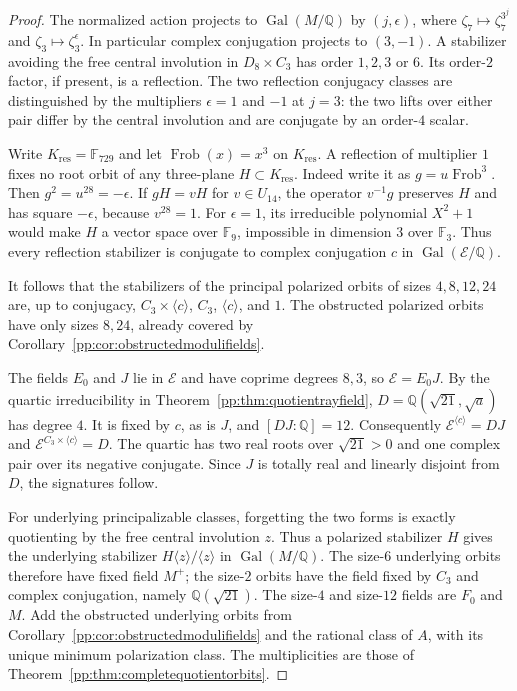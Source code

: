\begin{proof}
The normalized action projects to $\operatorname{Gal}(M/\mathbb Q)$
by $(j,\epsilon)$, where $\zeta_7\mapsto\zeta_7^{3^j}$ and
$\zeta_3\mapsto\zeta_3^\epsilon$. In particular complex conjugation
projects to $(3,-1)$. A stabilizer avoiding the free central involution
in $D_8\times C_3$ has order $1,2,3$ or $6$. Its order-$2$ factor,
if present, is a reflection. The two reflection conjugacy classes are
distinguished by the multipliers $\epsilon=1$ and $-1$ at $j=3$:
the two lifts over either pair differ by the central involution and
are conjugate by an order-$4$ scalar.

Write $K_{\mathrm{res}}=\mathbb F_{729}$ and let
$\operatorname{Frob}(x)=x^3$ on $K_{\mathrm{res}}$.
A reflection of multiplier $1$ fixes no root orbit of any three-plane
$H\subset K_{\mathrm{res}}$. Indeed write it as $g=u\operatorname{Frob}^3$. Then
$g^2=u^{28}=-\epsilon$. If $gH=vH$ for $v\in U_{14}$, the operator
$v^{-1}g$ preserves $H$ and has square $-\epsilon$, because $v^{28}=1$.
For $\epsilon=1$, its irreducible polynomial $X^2+1$ would make $H$
a vector space over $\mathbb F_9$, impossible in dimension $3$ over
$\mathbb F_3$. Thus every reflection stabilizer is conjugate to complex
conjugation $c$ in $\operatorname{Gal}(\mathcal E/\mathbb Q)$.

It follows that the stabilizers of the principal polarized orbits of
sizes $4,8,12,24$ are, up to conjugacy,
$C_3\times\langle c\rangle$, $C_3$, $\langle c\rangle$, and $1$.
The obstructed polarized orbits have only sizes $8,24$, already covered
by Corollary~\ref{pp:cor:obstructedmodulifields}.

The fields $E_0$ and $J$ lie in $\mathcal E$ and have coprime degrees
$8,3$, so $\mathcal E=E_0J$. By the quartic irreducibility in
Theorem~\ref{pp:thm:quotientrayfield},
$D=\mathbb Q(\sqrt{21},\sqrt a)$ has degree $4$.
It is fixed by $c$, as is $J$, and $[DJ:\mathbb Q]=12$.
Consequently $\mathcal E^{\langle c\rangle}=DJ$ and
$\mathcal E^{C_3\times\langle c\rangle}=D$.
The quartic has two real roots over $\sqrt{21}>0$ and one complex
pair over its negative conjugate. Since $J$ is totally real and
linearly disjoint from $D$, the signatures follow.

For underlying principalizable classes, forgetting the two forms is
exactly quotienting by the free central involution $z$.
Thus a polarized stabilizer $H$ gives the underlying stabilizer
$H\langle z\rangle/\langle z\rangle$ in $\operatorname{Gal}(M/\mathbb Q)$.
The size-$6$ underlying orbits therefore have fixed field $M^+$;
the size-$2$ orbits have the field fixed by $C_3$ and complex
conjugation, namely $\mathbb Q(\sqrt{21})$.
The size-$4$ and size-$12$ fields are $F_0$ and $M$.
Add the obstructed underlying orbits from
Corollary~\ref{pp:cor:obstructedmodulifields} and the rational class
of $A$, with its unique minimum polarization class.
The multiplicities are those of Theorem~\ref{pp:thm:completequotientorbits}.
\end{proof}

